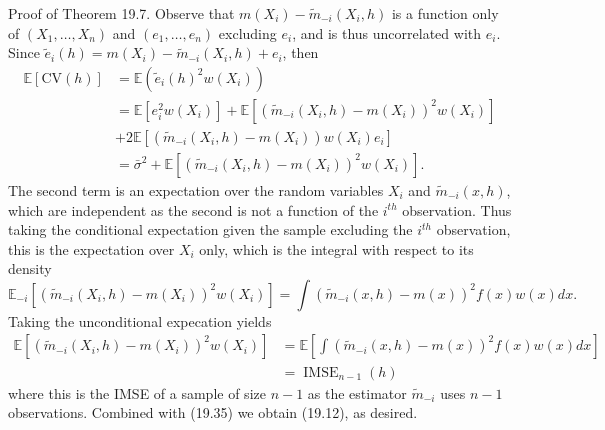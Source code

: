 \documentclass[10pt]{article}
\begin{document}
Proof of Theorem 19.7. Observe that $m\left(X_{i}\right)-\tilde{m}_{-i}\left(X_{i}, h\right)$ is a function only of $\left(X_{1}, \ldots, X_{n}\right)$ and $\left(e_{1}, \ldots, e_{n}\right)$ excluding $e_{i}$, and is thus uncorrelated with $e_{i}$. Since $\widetilde{e}_{i}(h)=m\left(X_{i}\right)-\widetilde{m}_{-i}\left(X_{i}, h\right)+e_{i}$, then
$$
\begin{aligned}
\mathbb{E}[\mathrm{CV}(h)] &=\mathbb{E}\left(\widetilde{e}_{i}(h)^{2} w\left(X_{i}\right)\right) \\
&=\mathbb{E}\left[e_{i}^{2} w\left(X_{i}\right)\right]+\mathbb{E}\left[\left(\widetilde{m}_{-i}\left(X_{i}, h\right)-m\left(X_{i}\right)\right)^{2} w\left(X_{i}\right)\right] \\
&+2 \mathbb{E}\left[\left(\widetilde{m}_{-i}\left(X_{i}, h\right)-m\left(X_{i}\right)\right) w\left(X_{i}\right) e_{i}\right] \\
&=\bar{\sigma}^{2}+\mathbb{E}\left[\left(\widetilde{m}_{-i}\left(X_{i}, h\right)-m\left(X_{i}\right)\right)^{2} w\left(X_{i}\right)\right] .
\end{aligned}
$$
The second term is an expectation over the random variables $X_{i}$ and $\widetilde{m}_{-i}(x, h)$, which are independent as the second is not a function of the $i^{t h}$ observation. Thus taking the conditional expectation given the sample excluding the $i^{t h}$ observation, this is the expectation over $X_{i}$ only, which is the integral with respect to its density
$$
\mathbb{E}_{-i}\left[\left(\widetilde{m}_{-i}\left(X_{i}, h\right)-m\left(X_{i}\right)\right)^{2} w\left(X_{i}\right)\right]=\int\left(\widetilde{m}_{-i}(x, h)-m(x)\right)^{2} f(x) w(x) d x .
$$
Taking the unconditional expecation yields
$$
\begin{aligned}
\mathbb{E}\left[\left(\widetilde{m}_{-i}\left(X_{i}, h\right)-m\left(X_{i}\right)\right)^{2} w\left(X_{i}\right)\right] &=\mathbb{E}\left[\int\left(\widetilde{m}_{-i}(x, h)-m(x)\right)^{2} f(x) w(x) d x\right] \\
&=\operatorname{IMSE}_{n-1}(h)
\end{aligned}
$$
where this is the IMSE of a sample of size $n-1$ as the estimator $\widetilde{m}_{-i}$ uses $n-1$ observations. Combined with (19.35) we obtain (19.12), as desired.
\end{document}
